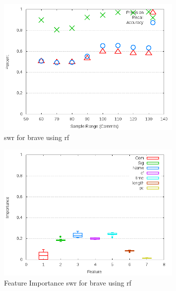 \begin{figure}[!t]
\centering
\includegraphics[width=0.8\textwidth]{images/rf/test_1/brave_sample_range.png}
\caption{\gls{swr} for brave using \gls{rf}}
\label{fig:test_1_brave_rf}
\end{figure}

\begin{figure}[!t]
\centering
\includegraphics[width=0.8\textwidth]{images/rf/test_1/brave_importance.png}
\caption{Feature Importance \gls{swr} for brave using \gls{rf}}
\label{fig:test_1_brave_rf_importance}
\end{figure}


